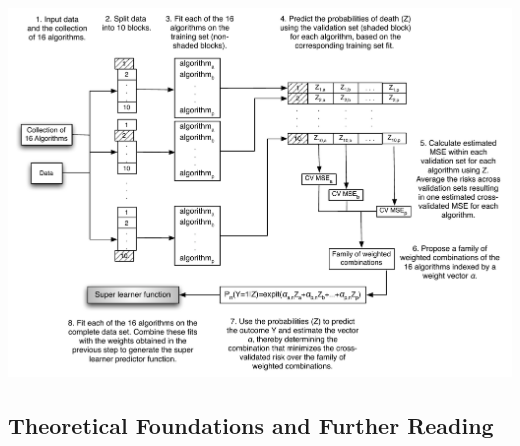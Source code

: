 \documentclass[12pt, krantz2,]{book}
\theoremstyle{definition}
\theoremstyle{definition}
\theoremstyle{definition}
\newcommand{\1}{\mathbbm{1}}
\begin{document}
\begin{center}\includegraphics[width=0.8\linewidth]{img/misc/SLKaiserNew} \end{center}

\hypertarget{theoretical-foundations-and-further-reading}{%
\subsection*{Theoretical Foundations and Further Reading}\label{theoretical-foundations-and-further-reading}}
\end{document}
